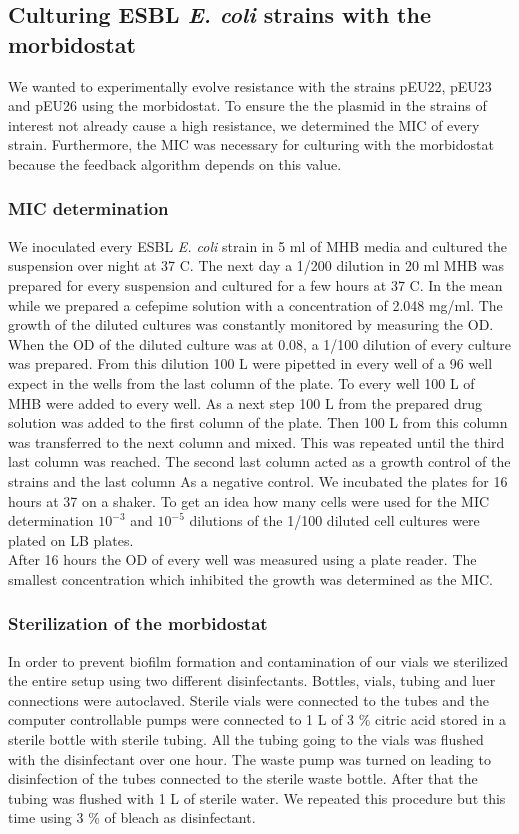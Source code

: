\subsection{Culturing ESBL \textit{E. coli} strains with the morbidostat}
We wanted to experimentally evolve resistance with the strains pEU22, pEU23 and pEU26 using the morbidostat. To ensure the the plasmid in the strains of interest not already cause a high resistance, we determined the MIC of every strain. Furthermore, the MIC was necessary for culturing with the morbidostat because the feedback algorithm depends on this value. 
\subsubsection{MIC determination}
We inoculated every ESBL \textit{E. coli} strain in 5 ml of MHB media and cultured the suspension over night at 37 \degree C. The next day a 1/200 dilution in 20 ml MHB was prepared for every suspension and cultured for a few hours at 37 \degree C. In the mean while we prepared a cefepime solution with a concentration of 2.048 mg/ml. The growth of the diluted cultures was constantly monitored by measuring the OD. When the OD of the diluted culture was at 0.08, a 1/100 dilution of every culture was prepared. From this dilution 100 \textmu L were pipetted in every well of a 96 well expect in the wells from the last column of the plate. To every well 100 \textmu L of MHB were added to every well. As a next step 100 \textmu L from the prepared drug solution was added to the first column of the plate. Then 100 \textmu L from this column was transferred to the next column and mixed. This was repeated until the third last column was reached. The second last column acted as a growth control of the strains and the last column As a negative control. We incubated the plates for 16 hours at 37 \degree \space on a shaker. To get an idea how many cells were used for the MIC determination $10^{-3}$ and $10^{-5}$ dilutions of the 1/100 diluted cell cultures were plated on LB plates.\\
After 16 hours the OD of every well was measured using a plate reader. The smallest concentration which inhibited the growth was determined as the MIC. 
\label{section:mic_determination}

\subsubsection{Sterilization of the morbidostat}
In order to prevent biofilm formation and contamination of our vials we sterilized the entire setup using two different disinfectants.
Bottles, vials, tubing and luer connections were autoclaved. Sterile vials were connected to the tubes and the computer controllable pumps were connected to 1 L of 3 \% citric acid stored in a sterile bottle with sterile tubing. All the tubing going to the vials was flushed with the disinfectant over one hour. The waste pump was turned on leading to disinfection of the tubes connected to the sterile waste bottle. After that the tubing was flushed with 1 L of sterile water. We repeated this procedure but this time using 3 \% of bleach as disinfectant.
\label{section:sterilization}

